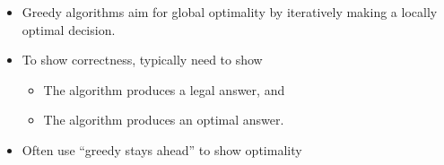 \begin{itemize}
    \item Greedy algorithms aim for global optimality by iteratively making a locally optimal decision.
    \item To show correctness, typically need to show
    
\begin{itemize}
    \item  The algorithm produces a legal answer, and
    \item The algorithm produces an optimal answer.

\end{itemize}

    \item Often use “greedy stays ahead” to show optimality
\end{itemize}

